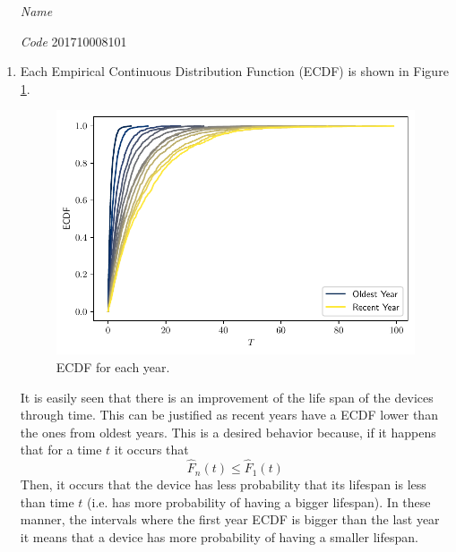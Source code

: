 \documentclass[fleqn]{article}
\begin{document}
 \vspace{0.3cm}
   \begin{itemize}[leftmargin=6.25cm, labelsep=0.5cm]

     \item[\textit{Name}]  %
     \item[\textit{Code}] 201710008101 %

   \end{itemize}
\vspace{0.3cm}

\begin{enumerate}[label=\alph*)]
  \item Each Empirical Continuous Distribution Function (ECDF) is shown in
    Figure \ref{fig:ecdfs}.
  \begin{figure}[H]
    \centering
    \includegraphics[scale=.5]{../figs/ecdfs.pdf}
    \caption{ECDF for each year.}
    \label{fig:ecdfs}
  \end{figure}
    It is easily seen that there is an improvement of the life span of the
    devices through time. This can be justified as recent years have a ECDF
    lower than the ones from oldest years. This is a desired behavior because,
    if it happens that for a time $t$ it occurs that
    \[
      \hat{F}_{n}(t) \le \hat{F}_{1}(t)
    \]
    Then, it occurs that the device has less probability that its lifespan is
    less than time $t$ (i.e. has more probability of having a bigger lifespan).
    In these manner, the intervals where the first year ECDF is bigger than the
    last year it means that a device has more probability of having a smaller
    lifespan.


\end{enumerate}
\end{document}
